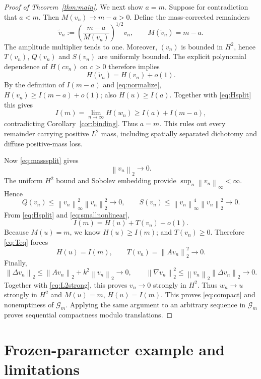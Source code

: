 \documentclass[11pt]{article}
\numberwithin{equation}{section}
\theoremstyle{remark}
\newcommand{\norm}[1]{\left\lVert #1\right\rVert}
\newcommand{\calG}{\mathcal{G}}
\begin{document}
\begin{proof}[Proof of Theorem~\ref{thm:main}]
We next show $a=m$.  Suppose for contradiction that $a<m$.
Then $M(v_n)\to m-a>0$.  Define the mass-corrected remainders
\[
\widetilde v_n:=\left(\frac{m-a}{M(v_n)}\right)^{1/2}v_n,
\qquad M(\widetilde v_n)=m-a.
\]
The amplitude multiplier tends to one.  Moreover, $(v_n)$ is bounded in
$H^2$, hence $T(v_n)$, $Q(v_n)$ and $S(v_n)$ are uniformly bounded.
The explicit polynomial dependence of $H(c v_n)$ on $c>0$ therefore implies
\begin{equation}\label{eq:normalize}
H(\widetilde v_n)=H(v_n)+o(1).
\end{equation}
By the definition of $I(m-a)$ and \eqref{eq:normalize},
$H(v_n)\ge I(m-a)+o(1)$; also $H(u)\ge I(a)$.
Together with \eqref{eq:Hsplit} this gives
\[
I(m)=\lim_{n\to\infty}H(w_n)
\ge I(a)+I(m-a),
\]
contradicting Corollary~\ref{cor:binding}.  Thus $a=m$.
This rules out every remainder carrying positive $L^2$ mass, including
spatially separated dichotomy and diffuse positive-mass loss.

Now \eqref{eq:masssplit} gives
\begin{equation}\label{eq:L2strong}
\norm{v_n}_2\longrightarrow0.
\end{equation}
The uniform $H^2$ bound and Sobolev embedding provide
$\sup_n\norm{v_n}_\infty<\infty$.  Hence
\begin{equation}\label{eq:smallnonlinear}
Q(v_n)\le\norm{v_n}_\infty^2\norm{v_n}_2^2\to0,
\qquad
S(v_n)\le\norm{v_n}_\infty^4\norm{v_n}_2^2\to0.
\end{equation}
From \eqref{eq:Hsplit} and \eqref{eq:smallnonlinear},
\begin{equation}\label{eq:Teq}
I(m)=H(u)+T(v_n)+o(1).
\end{equation}
Because $M(u)=m$, we know $H(u)\ge I(m)$; and $T(v_n)\ge0$.
Therefore \eqref{eq:Teq} forces
\begin{equation}\label{eq:Teqzero}
H(u)=I(m),\qquad T(v_n)=\norm{Av_n}_2^2\longrightarrow0.
\end{equation}
Finally,
\[
\norm{\Delta v_n}_2\le\norm{Av_n}_2+k^2\norm{v_n}_2\to0,
\qquad
\norm{\nabla v_n}_2^2
\le\norm{v_n}_2\norm{\Delta v_n}_2\to0.
\]
Together with \eqref{eq:L2strong}, this proves $v_n\to0$
strongly in $H^2$.  Thus $w_n\to u$ strongly in $H^2$ and
$M(u)=m$, $H(u)=I(m)$.  This proves \eqref{eq:compact} and nonemptiness
of $\calG_m$.  Applying the same argument to an arbitrary sequence
in $\calG_m$ proves sequential compactness modulo translations.
\end{proof}

\section{Frozen-parameter example and limitations}
\end{document}
